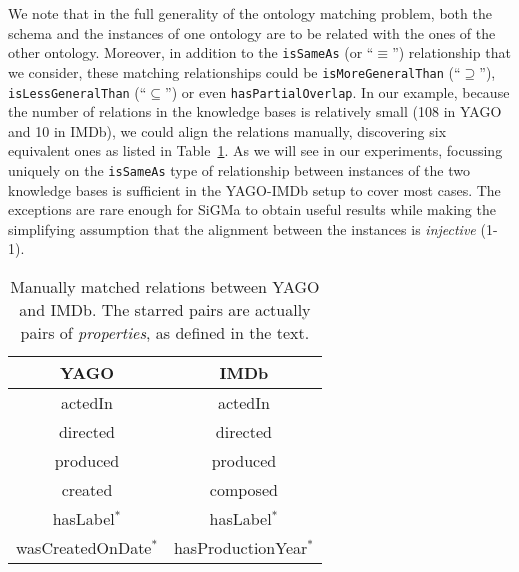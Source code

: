 \documentclass{sig-alternate}
\renewcommand{\tt}[1]{\texttt{#1}}
\begin{document}
We note that in the full generality of the ontology matching problem, both the schema and the instances of one ontology are to be related with the ones of the other ontology. Moreover, in addition to the \texttt{isSameAs} (or ``$\equiv$'') relationship that we consider, these matching relationships could be \texttt{isMoreGeneralThan} (``$\supseteq$''), \tt{isLessGeneral\-Than} (``$\subseteq$'') or even \texttt{hasPartialOverlap}. In our example, because the number of relations in the knowledge bases is relatively small (108 in \textsf{YAGO} and 10 in \textsf{IMDb}), we could align the relations manually, discovering six equivalent ones as listed in Table~\ref{tab:relations}. As we will see in our experiments, focussing uniquely on the \texttt{isSameAs} type of relationship between instances of the two knowledge bases is sufficient in the \textsf{YAGO}-\textsf{IMDb} setup to cover most cases. %
The exceptions are rare enough for \textsf{SiGMa} to obtain useful results while making the simplifying assumption that the alignment between the instances is \emph{injective} (1-1).
\begin{table}
\begin{center}
\begin{tabular}{cc}
\hline
\textsf{YAGO} & \textsf{IMDb} \\ \hline
actedIn  & actedIn  \\
directed & directed \\
produced & produced \\
created & composed \\
hasLabel$^*$ & hasLabel$^*$ \\
wasCreatedOnDate$^*$ & hasProductionYear$^*$ \\
\hline
\end{tabular}
\end{center}
\caption{Manually matched relations between \textsf{YAGO} and \textsf{IMDb}. \textnormal{The starred pairs are actually pairs of \emph{properties}, as defined in the text.}\label{tab:relations}}
\end{table}
\end{document}

